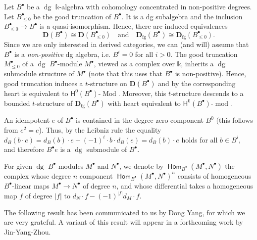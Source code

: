 \documentclass[a4paper,11pt, reqno]{amsart}
\def\DD{\mathbf D}
\def\dg{{\operatorname{dg}}}
\def\Mod{{\operatorname{Mod}}}
\def\mod{{\operatorname{mod}}}
\newcommand{\opname}[1]{\operatorname{\mathsf{#1}}}
\newcommand{\Hom}{\opname{Hom}}
\newcommand{\bH}{\mathsf{H}}
\theoremstyle{plain}
\theoremstyle{definition}
\numberwithin{equation}{section}
\begin{document}
Let $B^\bullet $ be a $\dg$ $\mathbb k$-algebra with cohomology concentrated in non-positive degrees.
Let $B^\bullet_{\leq 0}$ be the good truncation of $B^\bullet$. It is a dg subalgebra and the inclusion $B^\bullet_{\leq 0} \to B^\bullet $ is a quasi-isomorphism. 
 Hence, there are induced equivalences
\begin{equation}\label{eq:dg-truncation}
    \DD ( B^\bullet ) \cong \DD 
( B^\bullet_{\leq 0} ) \quad \text{and} \quad  \DD_{\mathrm{fg}} ( B^\bullet ) \cong \DD_{\mathrm{fg}} ( B^\bullet_{\leq 0} ) .
\end{equation}
Since we are only interested in derived categories, we can (and will) assume that $B^\bullet$ is a \emph{non-positive} dg algebra, i.e. $B^i=0$ for all $i>0$.
The good truncation $M_{\leq 0}^\bullet$ of a $\dg$ $B^\bullet$-module $M^\bullet$, viewed as a complex over $\mathbb k$, inherits a $\dg$ submodule structure of $M^\bullet $ (note that this uses that $B^\bullet $ is non-positive).
Hence, good truncation induces a $t$-structure on $\DD ( B^\bullet )$ and by \cite[Theorem 1.3]{hoshino-et-al} the corresponding heart is equivalent to $\bH^0( B^\bullet)\mbox{-}\Mod$.
Moreover, this $t$-structure descends to a bounded $t$-structure of $\DD_{\mathrm{fg}} ( B^\bullet ) $ with heart equivalent to $\bH^0( B^\bullet  )\mbox{-}\mod$.


An idempotent $e$ of $B^\bullet $ is contained in the degree zero component $B^0$ (this follows from $e^2 = e $).
Thus, by the Leibniz rule  the equality $d_B(b\cdot e) = d_B(b) \cdot e + (-1)^i \cdot b  \cdot d_B(e) = d_B(b) \cdot e$ holds for all $b\in B^i$, and therefore $B^\bullet e$ is a $\dg$ submodule of $B^\bullet$. 

For given $\dg$ $B^\bullet $-modules $M^\bullet$ and $N^\bullet$, we denote by $\Hom_{B^\bullet } ( M^\bullet , N^\bullet )$
the complex whose degree $n$
component $\Hom_{B^\bullet} ( M^\bullet , N^\bullet )^n$ consists of homogeneous $B^\bullet$-linear maps $M^\bullet \to N^\bullet$ of degree $n$,
and whose diﬀerential takes a homogeneous map $f$ of degree $|f|$ to
$d_{N} \cdot f - (-1)^{|f|} d_{M} \cdot f$.

The following result has been communicated to us by Dong Yang, for which we are very grateful. 
A variant of this result will appear in a forthcoming work \cite{dong-et-al} by Jin-Yang-Zhou.
\end{document}
